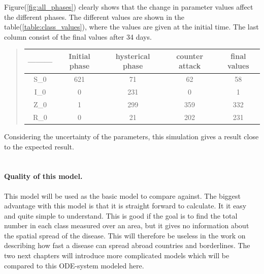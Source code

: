 \documentclass[%
twoside,                 %
final,                   %
10pt]{article}
\begin{document}
Figure(\ref{fig:all_phases}) clearly shows that the change in parameter values affect the different phases. The different values are shown in the table(\ref{table:class_values}), where the values are given at the initial time. The last column consist of the final values after 34 days.

\begin{quote}
\begin{tabular}{ccccc}
\hline
\multicolumn{1}{c}{ --------- } & \multicolumn{1}{c}{ Initial phase } & \multicolumn{1}{c}{ hysterical phase } & \multicolumn{1}{c}{ counter attack } & \multicolumn{1}{c}{ final values } \\
\hline
S_0              & 621              & 71               & 62               & 58               \\
I_0              & 0                & 231              & 0                & 1                \\
Z_0              & 1                & 299              & 359              & 332              \\
R_0              & 0                & 21               & 202              & 231              \\
\hline
\end{tabular}
\end{quote}

\noindent

Considering the uncertainty of the parameters, this simulation gives a result close to the expected result. 
\\
\\
\paragraph{Quality of this model.}
This model will be used as the basic model to compare against. The biggest advantage with this model is that it is straight forward to calculate. It it easy and quite simple to understand. This is good if the goal is to find the total number in each class measured over an area, but it gives no information about the spatial spread of the disease. This will therefore be useless in the work on describing how fast a disease can spread abroad countries and borderlines. The two next chapters will introduce more complicated models which will be compared to this ODE-system modeled here.








\printindex
\end{document}
